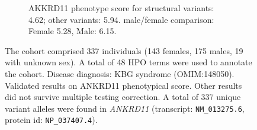 \begin{figure}[htbp]
\vspace{2em}

\begin{subfigure}[b]{0.95\textwidth}
\captionsetup{justification=raggedright,singlelinecheck=false}
\caption{AKKRD11 phenotype score for structural variants: 4.62; other variants: 5.94. male/female comparison: Female 5.28, Male: 6.15.}
\end{subfigure}

\vspace{2em}

\caption{The cohort comprised 337 individuals (143 females, 175 males, 19 with unknown sex). A total of 48 HPO terms were used to annotate the cohort. Disease diagnosis: KBG syndrome (OMIM:148050). Validated results on ANKRD11 phenotypical score. Other results did not survive multiple testing correction. A total of 337 unique variant alleles were found in \textit{ANKRD11} (transcript: \texttt{NM\_013275.6}, protein id: \texttt{NP\_037407.4}).}
\end{figure}
